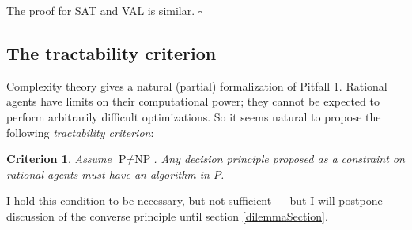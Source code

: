 \documentclass[letterpaper,12pt]{article}
\newtheorem{criterion}{Criterion}
\begin{document}
The proof for SAT and VAL is similar. $\square$

\subsection{The tractability criterion}
\label{tractabilitySection}
Complexity theory gives a natural (partial) formalization of Pitfall 1. Rational agents have limits on their computational power; they cannot be expected to perform arbitrarily difficult optimizations. So it seems natural to propose the following \emph{tractability criterion}:

\begin{criterion}
\label{tractability}
Assume $\text{P} \not = \text{NP}$. Any decision principle proposed as a constraint on rational agents must have an algorithm in $P$.
\end{criterion}

I hold this condition to be necessary, but not sufficient --- but I will postpone discussion of the converse principle until section \ref{dilemmaSection}.
\end{document}
